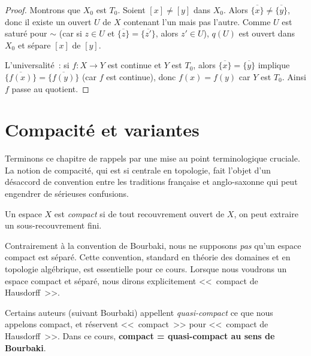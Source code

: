 \begin{proof}
Montrons que $X_0$ est $T_0$. Soient $[x] \neq [y]$ dans $X_0$. Alors
$\overline{\{x\}} \neq \overline{\{y\}}$, donc il existe un ouvert $U$ de $X$
contenant l'un mais pas l'autre. Comme $U$ est satur\'e pour $\sim$ (car si
$z \in U$ et $\overline{\{z\}} = \overline{\{z'\}}$, alors $z' \in U$), $q(U)$
est ouvert dans $X_0$ et s\'epare $[x]$ de $[y]$.

L'universalit\'e~: si $f\colon X \to Y$ est continue et $Y$ est $T_0$, alors
$\overline{\{x\}} = \overline{\{y\}}$ implique $\overline{\{f(x)\}} = \overline{\{f(y)\}}$
(car $f$ est continue), donc $f(x) = f(y)$ car $Y$ est $T_0$. Ainsi $f$ passe au quotient.
\end{proof}

\section{Compacit\'e et variantes}

Terminons ce chapitre de rappels par une mise au point terminologique
cruciale. La notion de compacit\'e, qui est si centrale en topologie, fait
l'objet d'un d\'esaccord de convention entre les traditions fran\c{c}aise et
anglo-saxonne qui peut engendrer de s\'erieuses confusions.

\begin{definition}[Compacit\'e]
Un espace $X$ est \emph{compact} si de tout recouvrement ouvert de $X$, on peut extraire
un sous-recouvrement fini.
\end{definition}

\begin{attention}
Contrairement \`a la convention de Bourbaki, nous ne supposons \emph{pas} qu'un espace
compact est s\'epar\'e. Cette convention, standard en th\'eorie des domaines et en
topologie alg\'ebrique, est essentielle pour ce cours. Lorsque nous voudrons un espace
compact et s\'epar\'e, nous dirons explicitement <<~compact de Hausdorff~>>.
\end{attention}

\begin{definition}
Certains auteurs (suivant Bourbaki) appellent \emph{quasi-compact} ce que nous appelons
compact, et r\'eservent <<~compact~>> pour <<~compact de Hausdorff~>>. Dans ce cours,
\textbf{compact = quasi-compact au sens de Bourbaki}.
\end{definition}

